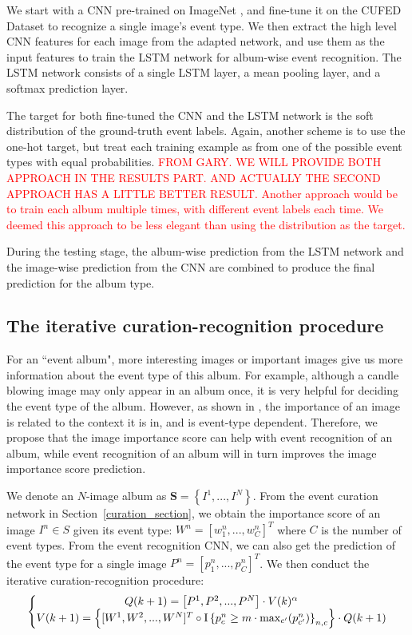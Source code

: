 \documentclass[runningheads]{llncs}
\begin{document}
We start with a CNN pre-trained on ImageNet \cite{caffe} \cite{imagenet}, and fine-tune it on the CUFED Dataset to recognize a single image's event type. We then extract the high level CNN features for each image from the adapted network, and use them as the input features to train the LSTM network for album-wise event recognition. The LSTM network consists of a single LSTM layer, a mean pooling layer, and a softmax prediction layer. 

The target for both fine-tuned the CNN and the LSTM network is the soft distribution of the ground-truth event labels. Again, another scheme is to use the one-hot target, but treat each training example as from one of the possible event types with equal probabilities. 
\textcolor{red}{FROM GARY. WE WILL PROVIDE BOTH APPROACH IN THE RESULTS PART. AND ACTUALLY THE SECOND APPROACH HAS A LITTLE BETTER RESULT. Another approach would be to train each album multiple times, with different event labels each time. We deemed this approach to be less elegant than using the distribution as the target.}


During the testing stage, the album-wise prediction from the LSTM network and the image-wise prediction from the CNN are combined to produce the final prediction for the album type. 

\subsection{The iterative curation-recognition procedure}
For an ``event album", more interesting images or important images give us more information about the event type of this album. For example, although a candle blowing image may only appear in an album once, it is very helpful for deciding the event type of the album. However, as shown in \cite{CVPR}, the importance of an image is related to the context it is in, and is event-type dependent. Therefore, we propose that the image importance score can help with event recognition of an album, while event recognition of an album will in turn improves the image importance score prediction.

We denote an $N$-image album as $\mathbf{S}= \left \{I^{1}, ..., I^{N}  \right \}$. From the event curation network in Section~\ref{curation_section}, we obtain the importance score of an image $I^{n} \in S $ given its event type: $W^{n}= \left [w_{1}^{n} , ..., w_{C}^{n}  \right ]^{T}$ where $C$ is the number of event types. From the event recognition CNN, we can also get the prediction of the event type for a single image $P^{n}= \left [ p_{1}^{n} , ..., p_{C}^{n}  \right ]^{T}$. We then conduct the iterative curation-recognition procedure:
\begin{equation}
\left\{\begin{matrix}
Q(k+1) = \left [ P^{1}, P^{2}, ..., P^{N} \right ] \cdot V(k)^{\alpha }\\ 
V(k+1) = \left \{[W^{1}, W^{2}, ..., W^{N}]^{T}\circ\textup{I}\left \{ p^{n}_{c}\geq m \cdot \max_{c'}(p^{n}_{c'}) \right \}_{n,c}\right \} \cdot  Q(k+1)
\end{matrix}\right.
\label{eq1}
\end{equation}
\end{document}
